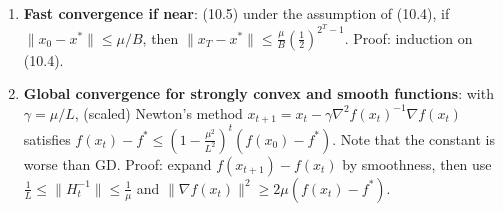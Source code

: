 \begin{enumerate}
    \item \textbf{Fast convergence if near}: (10.5) under the assumption of (10.4), if $\|x_0-x^*\| \le \mu/B$, then $\|x_T - x^*\| \le \frac{\mu}{B}(\frac{1}{2})^{2^T-1}$. Proof: induction on (10.4).
    \item \textbf{Global convergence for strongly convex and smooth functions}: with $\gamma=\mu/L$, (scaled) Newton's method $x_{t+1}=x_t - \gamma \nabla^2 f(x_t)^{-1} \nabla f(x_t)$ satisfies $f(x_t) - f^* \le (1-\frac{\mu^2}{L^2})^t (f(x_0) - f^*)$. Note that the constant is worse than GD. Proof: expand $f(x_{t+1}) - f(x_t)$ by smoothness, then use $\frac{1}{L}\le \|H_t^{-1}\| \le \frac{1}{\mu}$ and $\|\nabla f(x_t)\|^2 \ge 2\mu (f(x_t)-f^*)$.
\end{enumerate}